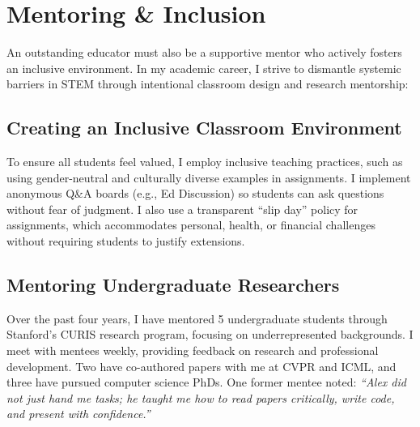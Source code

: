 \section{Mentoring \& Inclusion}
An outstanding educator must also be a supportive mentor who actively fosters an inclusive environment. In my academic career, I strive to dismantle systemic barriers in STEM through intentional classroom design and research mentorship:

\subsection{Creating an Inclusive Classroom Environment}
To ensure all students feel valued, I employ inclusive teaching practices, such as using gender-neutral and culturally diverse examples in assignments. I implement anonymous Q\&A boards (e.g., Ed Discussion) so students can ask questions without fear of judgment. I also use a transparent ``slip day'' policy for assignments, which accommodates personal, health, or financial challenges without requiring students to justify extensions.

\subsection{Mentoring Undergraduate Researchers}
Over the past four years, I have mentored 5 undergraduate students through Stanford's CURIS research program, focusing on underrepresented backgrounds. I meet with mentees weekly, providing feedback on research and professional development. Two have co-authored papers with me at CVPR and ICML, and three have pursued computer science PhDs. One former mentee noted: \emph{``Alex did not just hand me tasks; he taught me how to read papers critically, write code, and present with confidence.''}

